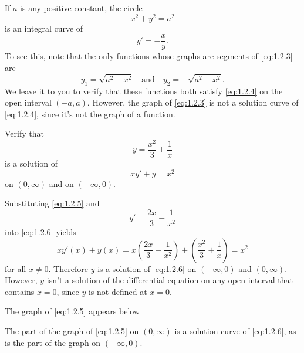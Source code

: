 \documentclass{ximera}
\begin{document}
\begin{example}
\label{example:1.2.1}
If $a$ is any positive constant,  the circle
\begin{equation} \label{eq:1.2.3}
x^2+y^2=a^2
\end{equation}
is an integral curve of
\begin{equation} \label{eq:1.2.4}
y'=-\frac{x}{y}.
\end{equation}
To see this, note that the only functions whose graphs are segments of
\eqref{eq:1.2.3} are
$$
y_1=\sqrt{a^2-x^2}\quad\text{and}\quad y_2=-\sqrt{a^2-x^2}.
$$
We leave it to you to verify that these functions both satisfy
\eqref{eq:1.2.4} on the open interval $(-a,a)$. However, the graph of \eqref{eq:1.2.3} is
not a solution
curve of \eqref{eq:1.2.4}, since it's not the graph of a function.
\end{example}
 
\begin{example}\label{example:1.2.2}
Verify that
\begin{equation} \label{eq:1.2.5}
y=\frac{x^2}{3}+\frac{1}{x}
\end{equation}
is a solution of
\begin{equation} \label{eq:1.2.6}
xy'+y=x^2
\end{equation}
 on $(0,\infty)$ and on $(-\infty,0)$.
  
\begin{explanation}
Substituting \eqref{eq:1.2.5} and
$$
y'=\frac{2x}{3} - \frac{1}{x^2}
$$
into \eqref{eq:1.2.6}  yields
$$
xy'(x)+y(x)=x \left(\frac{2x}{3} - \frac{1}{x^2}\right)+
\left(\frac{x^2}{3}+\frac{1}{x}\right)=x^2
$$
for all $x\neq 0$. Therefore $y$ is a solution of \eqref{eq:1.2.6}
on $(-\infty,0)$ and $(0,\infty)$.
 However, $y$ isn't  a solution of the differential
equation on any open interval that contains $x=0$, since  $y$ is
not defined at  $x=0$.
 
The graph of \eqref{eq:1.2.5} appears below
 
 
The part
of the graph of \eqref{eq:1.2.5} on $(0,\infty)$ is a solution curve of
\eqref{eq:1.2.6}, as is the part of the graph on $(-\infty,0)$.
\end{explanation}
\end{example}
 
\end{document}
